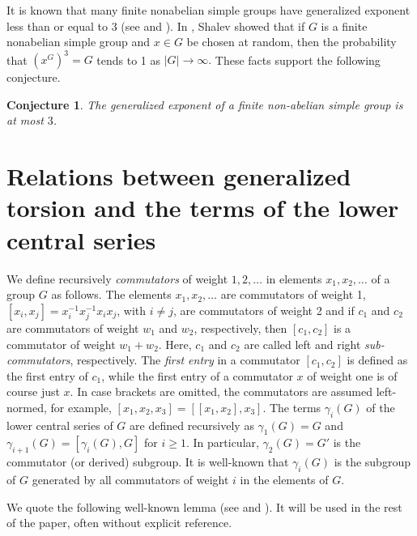 \documentclass[12pt,leqno]{amsart}
\newtheorem{conjecture}[theorem]{\sc Conjecture}
\theoremstyle{definition}
\begin{document}
 

It is known that many  finite nonabelian  simple groups have generalized exponent less than or equal to $3$ (see \cite[Theorem 3]{VG} and \cite[Chapters 1 and 2]{ASH}). 
In \cite[Theorem 2.6]{Sha}, Shalev showed that if $G$ is a  finite nonabelian  simple group and  $x\in G$ be chosen at
random, then the probability that $(x^G)^3=G$ tends to 1 as $|G|\rightarrow \infty.$ These facts support the following conjecture.

 
\begin{conjecture}
The generalized exponent of a finite non-abelian simple group is at most $3$.
\end{conjecture}


\section{Relations between generalized torsion and the terms of the lower central series}\label{sec:lcs}


We define recursively \emph{commutators} of weight $1,2,\ldots$ in elements $x_1,x_2,\ldots$ of a group $G$ as follows. The elements $x_1,x_2,\ldots$ are commutators of weight 1, $[x_i,x_j]=x_i^{-1}x_j^{-1}x_ix_j$, with $i\neq j$, are commutators of weight 2 and if $c_1$ and $c_2$ are commutators of weight $w_1$ and $w_2$, respectively, then $[c_1,c_2]$ is a commutator of weight $w_1+w_2$. Here, $c_1$ and $c_2$ are called left and right \emph{sub-commutators}, respectively.  The \emph{first entry} in  
a commutator $[c_1,c_2]$ is defined as the first entry of $c_1$, while the first entry of 
a commutator $x$ of weight one is of course just $x$. 
In case brackets are omitted,  the commutators are assumed left-normed, for example, $[x_1,x_2,x_3] = [[x_1,x_2],x_3]$.
The terms $\gamma_i(G)$ of the lower central series of $G$ are defined recursively as $\gamma_1(G)=G$ and $\gamma_{i+1}(G)=[\gamma_i(G),G]$ for 
$i\geq 1$. In particular, $\gamma_2(G)=G'$ is the commutator (or derived) subgroup. It is well-known that $\gamma_i(G)$ is the subgroup of $G$ generated by all commutators of weight $i$ in the elements of $G$.


We quote the following well-known lemma (see \cite[Lemma 5.1.5 and Exercise 5.1.4]{Rob} and \cite[ChapterIII, Section~9.4]{HuppertI}). It will be used in the rest of the paper, often without explicit reference. 
\end{document}
